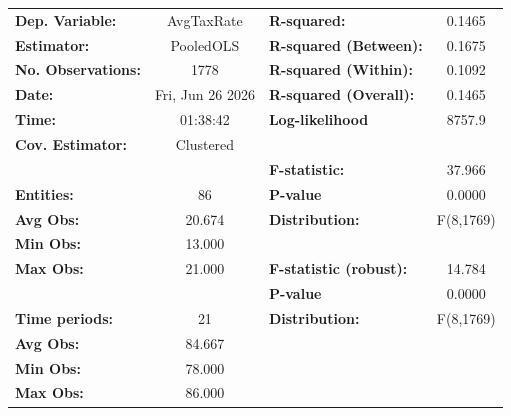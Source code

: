 \begin{center}
\begin{tabular}{lclc}
\toprule
\textbf{Dep. Variable:}                       &     AvgTaxRate     & \textbf{  R-squared:         }   &      0.1465      \\
\textbf{Estimator:}                           &     PooledOLS      & \textbf{  R-squared (Between):}  &      0.1675      \\
\textbf{No. Observations:}                    &        1778        & \textbf{  R-squared (Within):}   &      0.1092      \\
\textbf{Date:}                                &  Fri, Jun 26 2026  & \textbf{  R-squared (Overall):}  &      0.1465      \\
\textbf{Time:}                                &      01:38:42      & \textbf{  Log-likelihood     }   &      8757.9      \\
\textbf{Cov. Estimator:}                      &     Clustered      & \textbf{                     }   &                  \\
\textbf{}                                     &                    & \textbf{  F-statistic:       }   &      37.966      \\
\textbf{Entities:}                            &         86         & \textbf{  P-value            }   &      0.0000      \\
\textbf{Avg Obs:}                             &       20.674       & \textbf{  Distribution:      }   &    F(8,1769)     \\
\textbf{Min Obs:}                             &       13.000       & \textbf{                     }   &                  \\
\textbf{Max Obs:}                             &       21.000       & \textbf{  F-statistic (robust):} &      14.784      \\
\textbf{}                                     &                    & \textbf{  P-value            }   &      0.0000      \\
\textbf{Time periods:}                        &         21         & \textbf{  Distribution:      }   &    F(8,1769)     \\
\textbf{Avg Obs:}                             &       84.667       & \textbf{                     }   &                  \\
\textbf{Min Obs:}                             &       78.000       & \textbf{                     }   &                  \\
\textbf{Max Obs:}                             &       86.000       & \textbf{                     }   &                  \\

\end{tabular}
\end{center}
